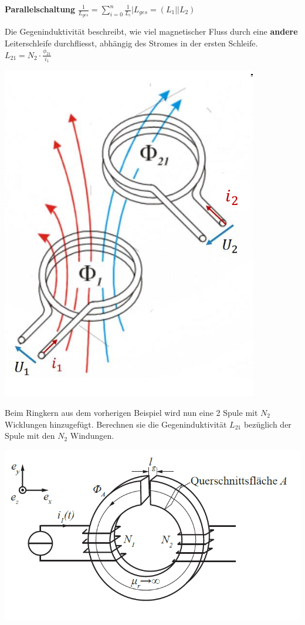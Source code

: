 		\textbf{Parallelschaltung}
		\formulaBegin
		$\displaystyle \frac{1}{L_{ges}} = \sum_{i=0}^n \frac{1}{L_i} \Bigg\rvert L_{ges} = (L_1 || L_2 )$
		\formulaEnd
	 \iend
\newpage


\beginip
Die Gegeninduktivität beschreibt, wie viel magnetischer Fluss durch eine \textbf{andere} Leiterschleife durchfliesst, abhängig
des Stromes in der ersten Schleife.
\formulaBegin
$\displaystyle L_{21} = N_2 \cdot \frac{\phi_{21}}{i_1}$
\formulaEnd
\begin{center}

	\includegraphics[scale=0.3]{img/gegenind}
\end{center}
\iend


\beginbsp
Beim Ringkern aus dem vorherigen Beispiel wird nun eine 2 Spule mit $N_2$ Wicklungen hinzugefügt. Berechnen sie die Gegeninduktivität $L_{21}$ bezüglich der Spule mit den $N_2$ Windungen.
\begin{center}

	\includegraphics[scale=0.5]{img/induktivitaet_bsp_2.png}
\end{center}
\iend

